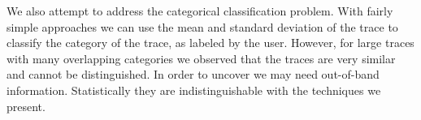 We also attempt to address the categorical classification problem.  With fairly simple approaches we can use the mean and standard deviation
of the trace to classify the category of the trace, as labeled by the user.  However, for large traces with many
overlapping categories we observed that the traces are very similar and cannot be distinguished.  In order to uncover we may need out-of-band
information.  Statistically they are indistinguishable with the techniques we present.









